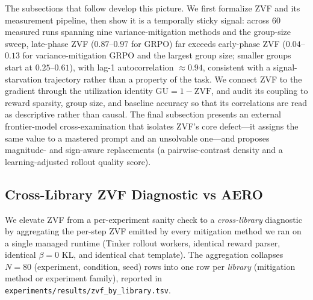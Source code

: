 \documentclass{article}
\begin{document}
The subsections that follow develop this picture. We first formalize ZVF and its
measurement pipeline, then show it is a temporally sticky signal: across 60
measured runs spanning nine variance-mitigation methods and the group-size sweep,
late-phase ZVF ($0.87$--$0.97$ for GRPO) far exceeds early-phase ZVF
($0.04$--$0.13$ for variance-mitigation GRPO and the largest group size; smaller
groups start at $0.25$--$0.61$), with lag-1 autocorrelation $\approx 0.94$, consistent with a
signal-starvation trajectory rather than a property of the task. We connect ZVF to
the gradient through the utilization identity $\mathrm{GU} = 1 - \mathrm{ZVF}$, and
audit its coupling to reward sparsity, group size, and baseline accuracy so that
its correlations are read as descriptive rather than causal. The final subsection
presents an external frontier-model cross-examination that isolates ZVF's core
defect---it assigns the same value to a mastered prompt and an unsolvable one---and
proposes magnitude- and sign-aware replacements (a pairwise-contrast density and a
learning-adjusted rollout quality score).
 

\subsection{Cross-Library ZVF Diagnostic vs AERO}
\label{sec:zvf-cross-library}
We elevate ZVF from a per-experiment sanity check to a
\emph{cross-library} diagnostic by aggregating the per-step ZVF emitted
by every mitigation method we ran on a single managed runtime (Tinker
rollout workers, identical reward parser, identical $\beta{=}0$ KL, and
identical chat template). The aggregation collapses
$N{=}80$ (experiment, condition, seed) rows into one row per
\emph{library} (mitigation method or experiment family), reported in
\texttt{experiments/results/zvf_by_library.tsv}.
\end{document}
